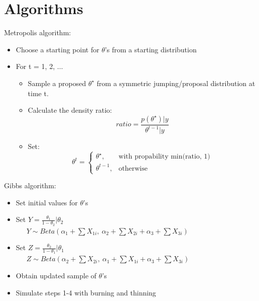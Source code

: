 \documentclass[11pt,a4paper]{article}
\begin{document}
\newpage

\section*{Algorithms}
Metropolis algorithm: 
\begin{itemize}
\item Choose a starting point for $\theta$'s from a starting distribution
\item For t = 1, 2, $\dots$
	\begin{itemize}
		\item Sample a proposed $\theta^{\star}$ from a symmetric jumping/proposal distribution at time t. 
		\item Calculate the density ratio: \\
		\begin{equation}
			ratio = \frac{p(\theta^{\star})|y}{\theta^{t-1}|y}
		\end{equation}
		\item   Set:\begin{equation}
    				\theta^t=
    				\begin{cases}
             		\theta^{\star}, & \text{with propability min(ratio, 1)} \\
   		 	  		\theta^{t-1}, & \text{otherwise}
   		 			\end{cases}
  			    \end{equation}

	\end{itemize}
\end{itemize}
Gibbs algorithm:
\begin{itemize}
	\item Set initial values for $\theta$'s
	\item Set $Y = \frac{\theta_{1}}{1-\theta_{2}}|\theta_{2}$\\
	\ \ \ $Y \sim Beta(\alpha_{1}+\sum{X_{1i}}, \ \alpha_{2}+\sum{X_{2i}} + \alpha_{3}+\sum{X_{3i}})$
	\item Set $Z = \frac{\theta_{2}}{1-\theta_{1}}|\theta_{1}$\\
	\ \ \ $Z \sim Beta(\alpha_{2}+\sum{X_{2i}}, \ \alpha_{1}+\sum{X_{1i}} + \alpha_{3}+\sum{X_{3i}})$
	\item Obtain updated sample of $\theta$'s
	\item Simulate steps 1-4 with burning and thinning
\end{itemize}
\end{document}
